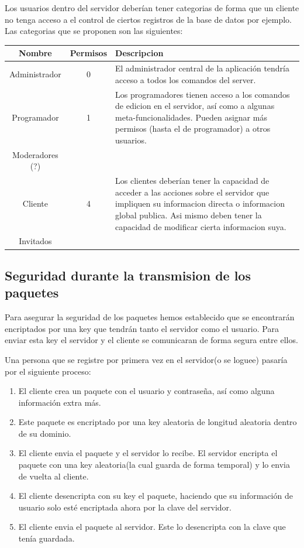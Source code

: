 \documentclass{article}
\theoremstyle{definition}
\begin{document}
Los usuarios dentro del servidor deberían tener categorias de forma que un cliente no tenga acceso a el control de ciertos registros de la base de datos por ejemplo. Las categorias que se proponen son las siguientes:
\begin{center}
\begin{tabular}{|c|c|p{9cm}|}
\hline Nombre & Permisos & Descripcion \\
\hline Administrador & 0 & El administrador central de la aplicación tendría acceso a todos los comandos del server. \\
Programador & 1 & Los programadores tienen acceso a los comandos de edicion en el servidor, así como a algunas meta-funcionalidades. Pueden asignar más permisos (hasta el de programador) a otros usuarios.\\
Moderadores (?) & & \\
Cliente & 4 & Los clientes deberían tener la capacidad de acceder a las acciones sobre el servidor que impliquen su informacion directa o informacion global publica. Asi mismo deben tener la capacidad de modificar cierta informacion suya. \\
Invitados && \\ \hline

\end{tabular}
\end{center}

\subsection{Seguridad durante la transmision de los paquetes}

Para asegurar la seguridad de los paquetes hemos establecido que se encontrarán encriptados por una key que tendrán tanto el servidor como el usuario. Para enviar esta key el servidor y el cliente se comunicaran de forma segura entre ellos. 

Una persona que se registre por primera vez en el servidor(o se loguee) pasaría por el siguiente proceso:

\begin{enumerate}
\item El cliente crea un paquete con el usuario y contraseña, así como alguna información extra más. \item Este paquete es encriptado por una key aleatoria de longitud aleatoria dentro de su dominio. 
\item El cliente envia el paquete y el servidor lo recibe. El servidor encripta el paquete con una key aleatoria(la cual guarda de forma temporal) y lo envia de vuelta al cliente.
\item El cliente desencripta con su key el paquete, haciendo que su información de usuario solo esté encriptada ahora por la clave del servidor.
\item El cliente envia el paquete al servidor. Este lo desencripta con la clave que tenía guardada.
\end{enumerate}
\end{document}
